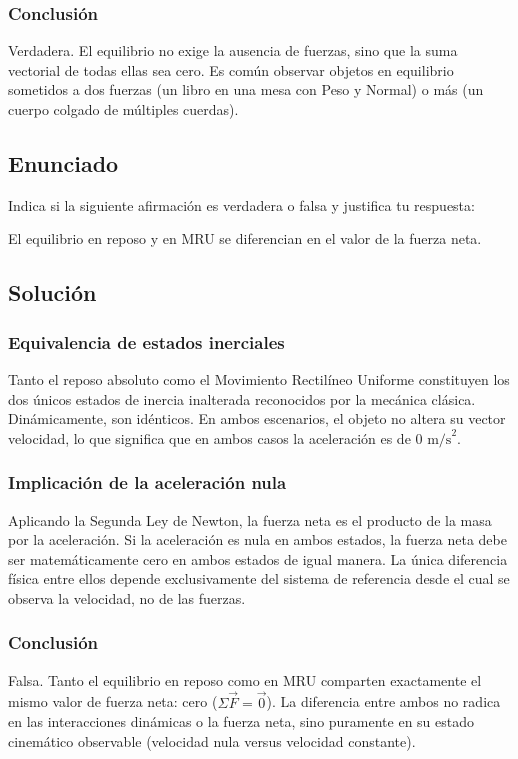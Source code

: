 \documentclass[12pt, a4paper]{article}
\begin{document}
\subsubsection*{Conclusión}
Verdadera. El equilibrio no exige la ausencia de fuerzas, sino que la suma vectorial de todas ellas sea cero. Es común observar objetos en equilibrio sometidos a dos fuerzas (un libro en una mesa con Peso y Normal) o más (un cuerpo colgado de múltiples cuerdas).

\newpage
\subsection*{Enunciado}
Indica si la siguiente afirmación es verdadera o falsa y justifica tu respuesta: 

El equilibrio en reposo y en MRU se diferencian en el valor de la fuerza neta.

\subsection*{Solución}

\subsubsection*{Equivalencia de estados inerciales}
Tanto el reposo absoluto como el Movimiento Rectilíneo Uniforme constituyen los dos únicos estados de inercia inalterada reconocidos por la mecánica clásica. Dinámicamente, son idénticos. En ambos escenarios, el objeto no altera su vector velocidad, lo que significa que en ambos casos la aceleración es de $0 \text{ m/s}^2$. 

\subsubsection*{Implicación de la aceleración nula}
Aplicando la Segunda Ley de Newton, la fuerza neta es el producto de la masa por la aceleración. Si la aceleración es nula en ambos estados, la fuerza neta debe ser matemáticamente cero en ambos estados de igual manera. La única diferencia física entre ellos depende exclusivamente del sistema de referencia desde el cual se observa la velocidad, no de las fuerzas.

\subsubsection*{Conclusión}
Falsa. Tanto el equilibrio en reposo como en MRU comparten exactamente el mismo valor de fuerza neta: cero ($\Sigma\vec{F} = \vec{0}$). La diferencia entre ambos no radica en las interacciones dinámicas o la fuerza neta, sino puramente en su estado cinemático observable (velocidad nula versus velocidad constante).
\end{document}
